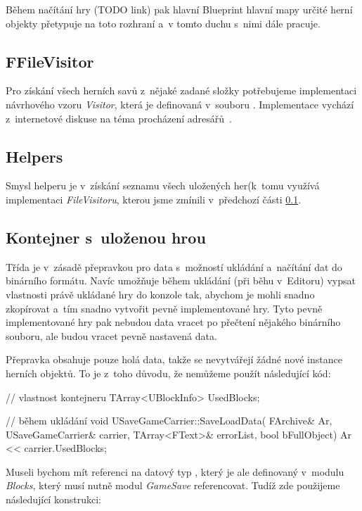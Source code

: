 Během načítání hry (TODO link) pak hlavní Blueprint hlavní mapy určité herní objekty přetypuje na toto rozhraní a~v tomto duchu s~nimi dále pracuje.

\subsection{FFileVisitor}
\label{subsec:ffv}
Pro získání všech herních savů z~nějaké zadané složky potřebujeme implementaci návrhového vzoru \textit{Visitor}, která je definovaná v~souboru . Implementace vychází z~internetové diskuse na téma procházení adresářů~\citep{ue_iterate_dir}.

\subsection{Helpers}
Smysl helperu  je v~získání seznamu všech uložených her\linebreak (k~tomu využívá implementaci \textit{FileVisitoru}, kterou jsme zmínili v~předchozí části \ref{subsec:ffv}.

\subsection{Kontejner s~uloženou hrou}
Třída  je v~zásadě přepravkou pro data s~možností ukládání a~načítání dat do binárního formátu. Navíc umožňuje během ukládání (při běhu v~Editoru) vypsat vlastnosti právě ukládané hry do konzole tak, abychom je mohli snadno zkopírovat a~tím snadno vytvořit pevně implementované hry. Tyto pevně implementované hry pak nebudou data vracet po přečtení nějakého binárního souboru, ale budou vracet pevně nastavená data. 

Přepravka obsahuje pouze holá data, takže se nevytvářejí žádné nové instance herních objektů. To je z~toho důvodu, že nemůžeme použít následující kód:

\begin{code}

// vlastnost kontejneru
TArray<UBlockInfo> UsedBlocks;

// během ukládání
void USaveGameCarrier::SaveLoadData(
	FArchive& Ar,
	USaveGameCarrier& carrier,
	TArray<FText>& errorList,
	bool bFullObject)
{
	Ar << carrier.UsedBlocks;
}
\end{code}
Museli bychom mít referenci na datový typ , který je ale definovaný v~modulu \textit{Blocks}, který musí nutně modul \textit{GameSave} referencovat. Tudíž zde použijeme následující konstrukci:

